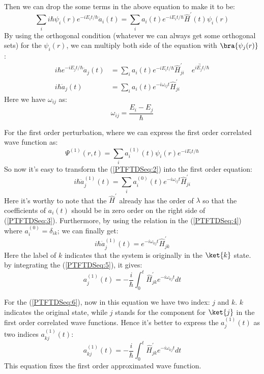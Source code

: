 Then we can drop the some terms in the above equation to make it to
be:
\begin{equation}\label{}
\sum_{i}i\hbar \psi_{i}(r)e^{-iE_{i}t/\hbar}\dot{a}_{i}(t) =
\sum_{i}a_{i}(t)e^{-iE_{i}t/\hbar}\hat{H}^{'}(t)\psi_{i}(r)
\end{equation}
By using the orthogonal condition (whatever we can always get some
orthogonal sets) for the $\psi_{i}(r)$, we can multiply both side of
the equation with $\bra{\psi_{j}(r)}$:
\begin{align}\label{PTFTDSeq:2}
i\hbar e^{-iE_{j}t/\hbar}\dot{a}_{j}(t) &=
\sum_{i}a_{i}(t)e^{-iE_{i}t/\hbar}\hat{H}^{'}_{ji}
 \quad \underrightarrow{e^{iE_{j}t/\hbar}}\nonumber \\
i\hbar \dot{a}_{j}(t) &= \sum_{i}a_{i}(t)e^{-i\omega_{ij}
t}\hat{H}^{'}_{ji}
\end{align}
Here we have $\omega_{ij}$ as:
\begin{equation}\label{}
\omega_{ij} = \frac{E_{i} - E_{j}}{\hbar}
\end{equation}

For the first order perturbation, where we can express the first
order correlated wave function as:
\begin{equation}\label{}
\Psi^{(1)}(r,t) =
\sum_{i}a^{(1)}_{i}(t)\psi_{i}(r)e^{-iE_{i}t/\hbar}
\end{equation}
So now it's easy to transform the (\ref{PTFTDSeq:2}) into the first
order equation:
\begin{equation}\label{PTFTDSeq:3}
i\hbar \dot{a}^{(1)}_{j}(t) = \sum_{i}a^{(0)}_{i}(t)e^{-i\omega_{ij}
t}\hat{H}^{'}_{ji}
\end{equation}
Here it's worthy to note that the $\hat{H}^{'}$ already has the
order of $\lambda$ so that the coefficients of $a_{i}(t)$ should be
in zero order on the right side of (\ref{PTFTDSeq:3}). Furthermore,
by using the relation in the (\ref{PTFTDSeq:4}) where $a_{i}^{(0)} =
\delta_{ik}$; we can finally get:
\begin{equation}\label{PTFTDSeq:5}
i\hbar \dot{a}^{(1)}_{j}(t) = e^{-i\omega_{kj} t}\hat{H}^{'}_{jk}
\end{equation}
Here the label of $k$ indicates that the system is originally in the
$\ket{k}$ state. by integrating the (\ref{PTFTDSeq:5}), it gives:
\begin{equation}\label{}
a^{(1)}_{j}(t) = -\frac{i}{\hbar}\int_{0}^{t}
\hat{H}^{'}_{jk}e^{-i\omega_{kj} t}dt
\end{equation}

For the (\ref{PTFTDSeq:6}), now in this equation we have two index:
$j$ and $k$. $k$ indicates the original state, while $j$ stands for
the component for $\ket{j}$ in the first order correlated wave
functions. Hence it's better to express the $a^{(1)}_{j}(t)$ as two
indices $a^{(1)}_{kj}(t)$:
\begin{equation}\label{PTFTDSeq:6}
a^{(1)}_{kj}(t) = -\frac{i}{\hbar}\int_{0}^{t}
\hat{H}^{'}_{jk}e^{-i\omega_{kj} t}dt
\end{equation}
This equation fixes the first order approximated wave function.

